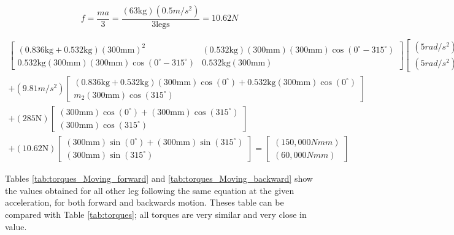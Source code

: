 \begin{equation}
    f = \frac{ma}{3} = \frac{(63\text{kg})(0.5m/s^2)}{3 \text{legs}} = 10.62 N
\end{equation}

\begin{equation} \label{eq:dynamic_equation_example}
    \begin{split}
        \begin{bmatrix} 
            (0.836 \text{kg} + 0.532 \text{kg}) (300 \text{mm})^2 & (0.532 \text{kg}) (300 \text{mm}) (300 \text{mm}) \cos(0^{\circ} - 315^{\circ}) \\
            0.532 \text{kg} (300 \text{mm}) (300 \text{mm}) \cos(0^{\circ} - 315^{\circ}) & 0.532 \text{kg} (300 \text{mm})
        \end{bmatrix} 
        \begin{bmatrix} (5 rad/s^2) \\ (5 rad/s^2) \end{bmatrix}\\
        +
        (9.81 m/s^2) \begin{bmatrix}
            (0.836 \text{kg} + 0.532 \text{kg}) (300 \text{mm}) \cos(0^{\circ}) + 0.532 \text{kg} (300 \text{mm}) \cos(0^{\circ}) \\
            m_2 (300 \text{mm}) \cos(315^{\circ})
        \end{bmatrix} \\
        +
        (285 \text{N}) \begin{bmatrix}
            (300 \text{mm})\cos(0^{\circ}) + (300 \text{mm})\cos(315^{\circ}) \\
            (300 \text{mm})\cos(315^{\circ})
            \end{bmatrix}
            \\+ (10.62 \text{N}) \begin{bmatrix}
           (300 \text{mm})\sin(0^{\circ}) + (300 \text{mm})\sin(315^{\circ}{}) \\
            (300 \text{mm})\sin(315^{\circ}{})
        \end{bmatrix}
        =
        \begin{bmatrix}
        (150,000 Nmm) \\ (60,000 Nmm)
        \end{bmatrix}
    \end{split}
\end{equation}

Tables \ref{tab:torques_Moving_forward} and \ref{tab:torques_Moving_backward} show the values obtained for all other leg following the same equation at the given acceleration, for both forward and backwards motion. Theses table can be compared with Table \ref{tab:torques}; all torques are very similar and very close in value.

